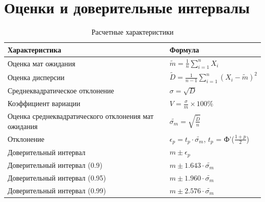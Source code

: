 \documentclass{article}
\begin{document}
\section{Оценки и доверительные интервалы}
\begin{table}[H]
    \centering
    \caption{Расчетные характеристики}
    \begin{tabular}{|l|l|}
    \hline
    Характеристика & Формула \\
    \hline
    Оценка мат ожидания & $\widetilde{m}  = \frac{1}{n} \sum_{i=1}^{n} X_i$ \\
    \hline
    Оценка дисперсии & $\widetilde{D} = \frac{1}{n-1} \sum_{i=1}^{n} (X_i - \widetilde{m})^2$ \\
    \hline
    Среднеквадратическое отклонение & $\sigma = \sqrt{D}$ \\
    \hline
    Коэффициент вариации & $V = \frac{\sigma}{m} \times 100\%$ \\
    \hline
    Оценка среднеквадратического отклонения мат ожидания & $\widetilde{\sigma_m} = \sqrt{\frac{\widetilde{D}}{n}}$ \\
    \hline
    Отклонение & $\epsilon_p = t_p \cdot \widetilde{\sigma_m}$, $t_p$ = Ф'($\frac{1 + p}{2}$)  \\
    \hline
    Доверительный интервал & $m \pm \epsilon_p$ \\
    \hline
    Доверительный интервал (0.9) & $m \pm 1.643\cdot \widetilde{\sigma_m}$ \\
    \hline
    Доверительный интервал (0.95) & $m \pm 1.960\cdot \widetilde{\sigma_m}$ \\
    \hline
    Доверительный интервал (0.99) & $m \pm 2.576\cdot \widetilde{\sigma_m}$ \\
    \hline
    \end{tabular}
    \end{table}
\end{document}
